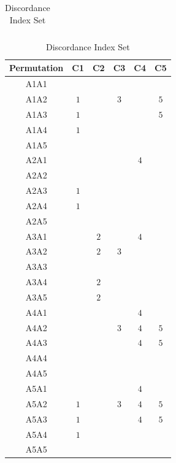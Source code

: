 \begin{table}[!ht]
{\begin{tabular}{|c|c|c|c|c|c|}
            \bottomrule
        \end{tabular}
    }
    \hfill
    \parbox{0.49\textwidth}{
        \centering
        \caption{Discordance Index Set}
        \label{tab:dis}

        \begin{tabular}{|c|c|c|c|c|c|}
            \toprule
            Permutation & C1  & C2  & C3  & C4  & C5  \\

            \midrule
            A1A1        &     &     &     &     &     \\
            A1A2        & $1$ &     & $3$ &     & $5$ \\
            A1A3        & $1$ &     &     &     & $5$ \\
            A1A4        & $1$ &     &     &     &     \\
            A1A5        &     &     &     &     &     \\
            A2A1        &     &     &     & $4$ &     \\
            A2A2        &     &     &     &     &     \\
            A2A3        & $1$ &     &     &     &     \\
            A2A4        & $1$ &     &     &     &     \\
            A2A5        &     &     &     &     &     \\
            A3A1        &     & $2$ &     & $4$ &     \\
            A3A2        &     & $2$ & $3$ &     &     \\
            A3A3        &     &     &     &     &     \\
            A3A4        &     & $2$ &     &     &     \\
            A3A5        &     & $2$ &     &     &     \\
            A4A1        &     &     &     & $4$ &     \\
            A4A2        &     &     & $3$ & $4$ & $5$ \\
            A4A3        &     &     &     & $4$ & $5$ \\
            A4A4        &     &     &     &     &     \\
            A4A5        &     &     &     &     &     \\
            A5A1        &     &     &     & $4$ &     \\
            A5A2        & $1$ &     & $3$ & $4$ & $5$ \\
            A5A3        & $1$ &     &     & $4$ & $5$ \\
            A5A4        & $1$ &     &     &     &     \\
            A5A5        &     &     &     &     &     \\

            \bottomrule
        \end{tabular}
    }
\end{table}

